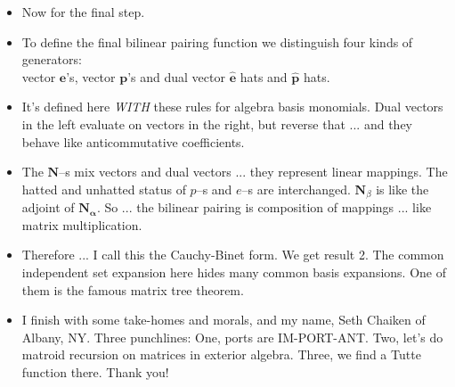\documentclass[14pt]{extarticle}
\begin{document}
{\begin{itemize}
\item Now for the final step.

\item
  To define the final bilinear pairing function 
  we distinguish 
  four kinds of generators:\\
  vector $\mathbf{e}$'s, vector $\mathbf{p}$'s and
dual vector $\widehat{\mathbf{e}}$ hats and $\widehat{\mathbf{p}}$ hats.  

\item
  It's defined here \emph{WITH} these rules for algebra basis monomials.  Dual vectors
  in the left evaluate on vectors in the right, but reverse that ... and
  they behave like anticommutative coefficients.

\item
  The $\mathbf{N}$--s mix vectors and dual vectors ... they represent linear mappings.
  The hatted and unhatted status of $p$--s and $e$--s are interchanged.
  $\mathbf{N}_\beta$ is like the adjoint of $\mathbf{N_\alpha}$.  So ... the
  bilinear pairing is composition of mappings  ... like matrix multiplication.

\item
  Therefore ... I call this the Cauchy-Binet form.  We get result 2.  The common
  independent set expansion here hides many common basis expansions.  One of them
  is the famous matrix tree theorem.

\item
  I finish with some take-homes and morals, and my name, Seth Chaiken
  of Albany, NY.
  Three punchlines:  One, ports are IM-PORT-ANT.
  Two, let's do matroid recursion on matrices in exterior algebra.
  Three, we find a Tutte function there.
  Thank you!
  \end{itemize}
}
\end{document}
